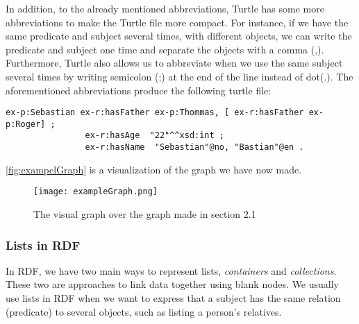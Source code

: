 \para
In addition, to the already mentioned abbreviations, Turtle has some more abbreviations to make the Turtle file more compact. For instance, if we have the same predicate and subject several times, with different objects, we can write the predicate and subject one time and separate the objects with a comma (,). Furthermore, Turtle also allows us to abbreviate when we use the same subject several times by writing semicolon (;) at the end of the line instead of dot(.). The aforementioned abbreviations produce the following turtle file:

\begin{lstlisting}[frame=single, language=turtle]
ex-p:Sebastian ex-r:hasFather ex-p:Thommas, [ ex-r:hasFather ex-p:Roger] ; 
                ex-r:hasAge  "22"^^xsd:int ; 
                ex-r:hasName  "Sebastian"@no, "Bastian"@en .
\end{lstlisting}
\autoref{fig:exampelGraph} is a visualization of the graph we have now made.

\begin{figure}
    \centering
    \texttt{[image: exampleGraph.png]}
    \caption{The visual graph over the graph made in section 2.1}
    \label{fig:exampelGraph}
\end{figure}

\subsubsection{Lists in RDF}
In RDF, we have two main ways to represent lists, \emph{containers} and \emph{collections}. These two are approaches to link data together using blank nodes. We usually use lists in RDF when we want to express that a subject has the same relation (predicate) to several objects, such as listing a person's relatives.

